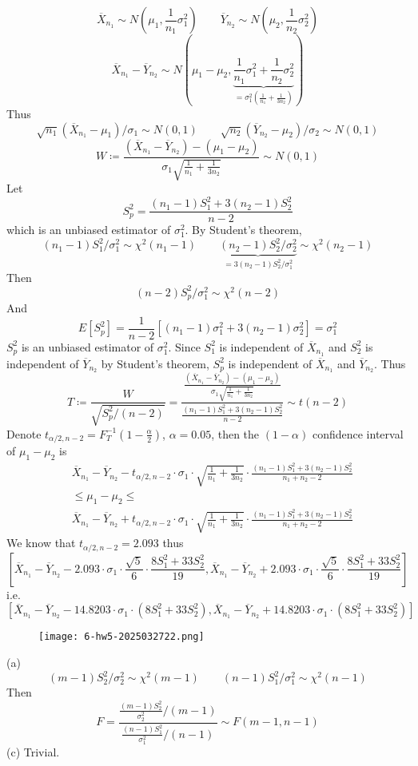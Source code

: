 \[
\overline{X}_{n_1}\sim N\left( \mu_1,\frac{1}{n_1} \sigma_1^2 \right)\qquad \overline{Y}_{n_2}\sim N\left( \mu_2,\frac{1}{n_2} \sigma_2^2 \right)
\]
\[
\overline{X}_{n_1}-\overline{Y}_{n_2}\sim N\left( \mu_1-\mu_2,\underbrace{ \frac{1}{n_1} \sigma^{2}_{1}+\frac{1}{n_2} \sigma_2^2 }_{ =\sigma_1^2\left( \frac{1}{n_1}+\frac{1}{3n_2} \right) } \right)
\]
Thus
\[
\sqrt{ n_1 }(\overline{X}_{n_1}-\mu_1)/\sigma_1\sim N(0,1)\qquad \sqrt{ n_2 }(\overline{Y}_{n_2}-\mu_2)/\sigma_2\sim N(0,1)
\]
\[
W\coloneqq \frac{(\overline{X}_{n_1}-\overline{Y}_{n_2})-(\mu_1-\mu_2)}{\sigma_1\sqrt{ \frac{1}{n_1} +\frac{1}{3n_2}  }}\sim N(0,1)
\]
Let
\[
S_{p}^2=\frac{(n_1-1)S_1^2+3(n_2-1)S_2^2}{n-2}
\]
which is an unbiased estimator of $\sigma_1^2$. By Student's theorem,
\[
(n_1-1)S_1^2/\sigma_1^2\sim \chi^{2}(n_1-1)\qquad \underbrace{ (n_2-1)S_2^2/\sigma_2^2 }_{ =3(n_2-1)S_2^2/\sigma_1^2 }\sim \chi^{2}(n_2-1)
\]
Then
\[
(n-2)S_{p}^2/\sigma_1^2\sim \chi^{2}(n-2)
\]
And
\[
E[S_{p}^2]=\frac{1}{n-2}[(n_1-1)\sigma_1^2+3(n_2-1)\sigma_2^2]=\sigma_1^2
\]
$S_{p}^2$ is an unbiased estimator of $\sigma_1^2$. Since $S_1^2$ is independent of $\overline{X}_{n_1}$ and $S_2^2$ is independent of $\overline{Y}_{n_2}$ by Student's theorem, $S_{p}^2$ is independent of $\overline{X}_{n_1}$ and $\overline{Y}_{n_2}$. Thus
\[
T\coloneqq \frac{W}{\sqrt{ S_{p}^2/(n-2) }}=\frac{\frac{(\overline{X}_{n_1}-\overline{Y}_{n_2})-(\mu_1-\mu_2)}{\sigma_1\sqrt{ \frac{1}{n_1} +\frac{1}{3n_2}  }}}{\frac{(n_1-1)S_1^2+3(n_2-1)S_2^2}{n-2}}\sim t(n-2)
\]
Denote $t_{\alpha/2,n-2}=F_{T}^{-1}\left( 1-\frac{\alpha}{2} \right)$, $\alpha=0.05$, then the $(1-\alpha)$ confidence interval of $\mu_1-\mu_2$ is
\[
\begin{aligned}
 & \overline{X}_{n_1}-\overline{Y}_{n_2}-t_{\alpha/2,n-2}\cdot \sigma_1\cdot \sqrt{ \frac{1}{n_1} +\frac{1}{3n_2}  }\cdot\frac{(n_1-1)S_1^2+3(n_2-1)S_2^2}{n_1+n_2-2} \\
 & \leq \mu_1-\mu_2\leq \\
 &  \overline{X}_{n_1}-\overline{Y}_{n_2}+t_{\alpha/2,n-2}\cdot \sigma_1\cdot \sqrt{ \frac{1}{n_1} +\frac{1}{3n_2}  }\cdot\frac{(n_1-1)S_1^2+3(n_2-1)S_2^2}{n_1+n_2-2}
\end{aligned}
\]
We know that $t_{\alpha/2,n-2}=2.093$ thus
\[
[\overline{X}_{n_1}-\overline{Y}_{n_2}-2.093\cdot \sigma_1\cdot \frac{\sqrt{ 5 }}{6}\cdot\frac{8S_1^2+33S_2^2}{19},\overline{X}_{n_1}-\overline{Y}_{n_2}+2.093\cdot \sigma_1\cdot \frac{\sqrt{ 5 }}{6}\cdot\frac{8S_1^2+33S_2^2}{19}]
\]
i.e.
\[
[\overline{X}_{n_1}-\overline{Y}_{n_2}-14.8203\cdot\sigma_1\cdot(8S_1^2+33S_2^2),\overline{X}_{n_1}-\overline{Y}_{n_2}+14.8203\cdot\sigma_1\cdot(8S_1^2+33S_2^2)]
\]
\begin{exercise}[(a)(c)]
\begin{figure}[H]
\centering
\texttt{[image: 6-hw5-2025032722.png]}
\label{}
\end{figure}
\end{exercise}
(a)
\[
(m-1)S_2^2/\sigma_2^2\sim \chi^{2}(m-1)\qquad (n-1)S_1^2/\sigma_1^2\sim \chi^{2}(n-1)
\]
Then
\[
F=\frac{\frac{(m-1)S_2^2}{\sigma_2^2}/(m-1)}{\frac{(n-1)S_1^2}{\sigma_1^2}/(n-1)}\sim F(m-1,n-1)
\]
(c)
Trivial.

